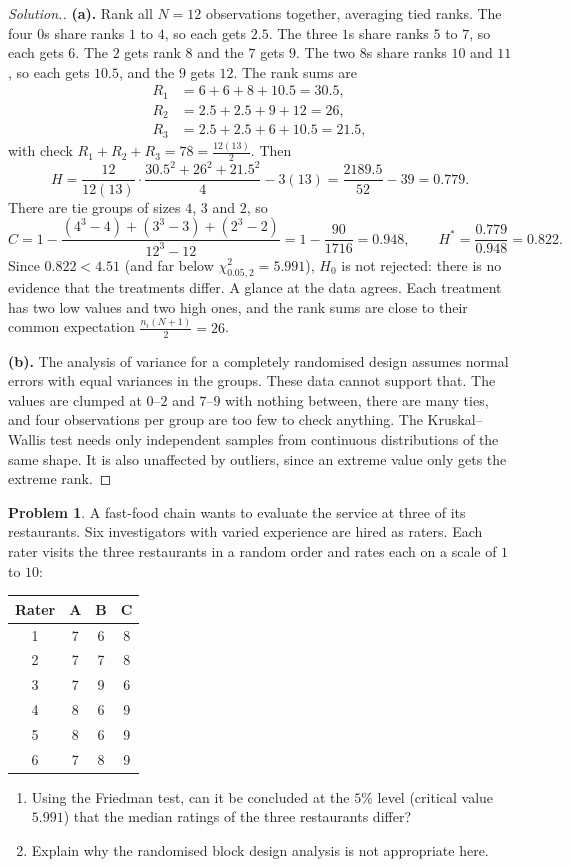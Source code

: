 \documentclass[11pt,a4paper]{article}
\theoremstyle{definition}
\newtheorem{problemx}{Problem}[section]
\newenvironment{problem}{\begin{problemx}}{\end{problemx}}
\newenvironment{solution}
  {\renewcommand{\qedsymbol}{}\begin{proof}[\textit{Solution}.]}
  {\end{proof}}
\begin{document}
\begin{solution}
\textbf{(a).} Rank all $N = 12$ observations together, averaging tied ranks. The four
$0$s share ranks $1$ to $4$, so each gets $2.5$. The three $1$s share ranks $5$ to $7$,
so each gets $6$. The $2$ gets rank $8$ and the $7$ gets $9$. The two $8$s share ranks
$10$ and $11$, so each gets $10.5$, and the $9$ gets $12$. The rank sums are
\begin{align*}
R_1 &= 6+6+8+10.5 = 30.5,\\
R_2 &= 2.5+2.5+9+12 = 26,\\
R_3 &= 2.5+2.5+6+10.5 = 21.5,
\end{align*}
with check $R_1+R_2+R_3 = 78 = \frac{12(13)}{2}$. Then
\[H = \frac{12}{12(13)}\cdot\frac{30.5^{2}+26^{2}+21.5^{2}}{4}-3(13)
 = \frac{2189.5}{52}-39 = 0.779.\]
There are tie groups of sizes $4$, $3$ and $2$, so
\[C = 1-\frac{(4^{3}-4)+(3^{3}-3)+(2^{3}-2)}{12^{3}-12} = 1-\frac{90}{1716} = 0.948,
\qquad H^{*} = \frac{0.779}{0.948} = 0.822.\]
Since $0.822 < 4.51$ (and far below $\chi^{2}_{0.05,2} = 5.991$), $H_0$ is not rejected:
there is no evidence that the treatments differ. A glance at the data agrees. Each
treatment has two low values and two high ones, and the rank sums are close to their
common expectation $\frac{n_i(N+1)}{2} = 26$.

\textbf{(b).} The analysis of variance for a completely randomised design assumes
normal errors with equal variances in the groups. These data cannot support that. The
values are clumped at $0$--$2$ and $7$--$9$ with nothing between, there are many ties,
and four observations per group are too few to check anything. The Kruskal--Wallis test
needs only independent samples from continuous distributions of the same shape. It is
also unaffected by outliers, since an extreme value only gets the extreme rank.
\end{solution}

\begin{problem}
A fast-food chain wants to evaluate the service at three of its restaurants. Six
investigators with varied experience are hired as raters. Each rater visits the three
restaurants in a random order and rates each on a scale of $1$ to $10$:
\begin{center}
\begin{tabular}{c|ccc}
Rater & A & B & C\\\hline
1 & 7 & 6 & 8\\
2 & 7 & 7 & 8\\
3 & 7 & 9 & 6\\
4 & 8 & 6 & 9\\
5 & 8 & 6 & 9\\
6 & 7 & 8 & 9
\end{tabular}
\end{center}
\begin{enumerate}
\item[(a).] Using the Friedman test, can it be concluded at the $5\%$ level (critical
value $5.991$) that the median ratings of the three restaurants differ?
\item[(b).] Explain why the randomised block design analysis is not appropriate here.
\end{enumerate}
\end{problem}
\end{document}
